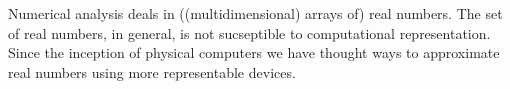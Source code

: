 Numerical analysis deals in ((multidimensional) arrays of) real numbers. The
set of real numbers, in general, is not sucseptible to computational
representation\cite{turing-1936-7}. Since the inception of physical computers
we have thought ways to approximate real numbers using more representable
devices.



